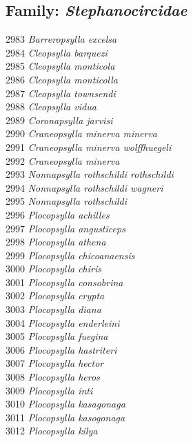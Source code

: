 \documentclass[
]{article}
\begin{document}
\hypertarget{family-stephanocircidae}{%
\subsection{\texorpdfstring{Family:
\emph{Stephanocircidae}}{Family: Stephanocircidae}}\label{family-stephanocircidae}}

2983 \emph{Barreropsylla excelsa}\\
2984 \emph{Cleopsylla barquezi}\\
2985 \emph{Cleopsylla monticola}\\
2986 \emph{Cleopsylla monticolla}\\
2987 \emph{Cleopsylla townsendi}\\
2988 \emph{Cleopsylla vidua}\\
2989 \emph{Coronapsylla jarvisi}\\
2990 \emph{Craneopsylla minerva minerva}\\
2991 \emph{Craneopsylla minerva wolffhuegeli}\\
2992 \emph{Craneopsylla minerva}\\
2993 \emph{Nonnapsylla rothschildi rothschildi}\\
2994 \emph{Nonnapsylla rothschildi wagneri}\\
2995 \emph{Nonnapsylla rothschildi}\\
2996 \emph{Plocopsylla achilles}\\
2997 \emph{Plocopsylla angusticeps}\\
2998 \emph{Plocopsylla athena}\\
2999 \emph{Plocopsylla chicoanaensis}\\
3000 \emph{Plocopsylla chiris}\\
3001 \emph{Plocopsylla consobrina}\\
3002 \emph{Plocopsylla crypta}\\
3003 \emph{Plocopsylla diana}\\
3004 \emph{Plocopsylla enderleini}\\
3005 \emph{Plocopsylla fuegina}\\
3006 \emph{Plocopsylla hastriteri}\\
3007 \emph{Plocopsylla hector}\\
3008 \emph{Plocopsylla heros}\\
3009 \emph{Plocopsylla inti}\\
3010 \emph{Plocopsylla kasagonaga}\\
3011 \emph{Plocopsylla kasogonaga}\\
3012 \emph{Plocopsylla kilya}\\
\end{document}
